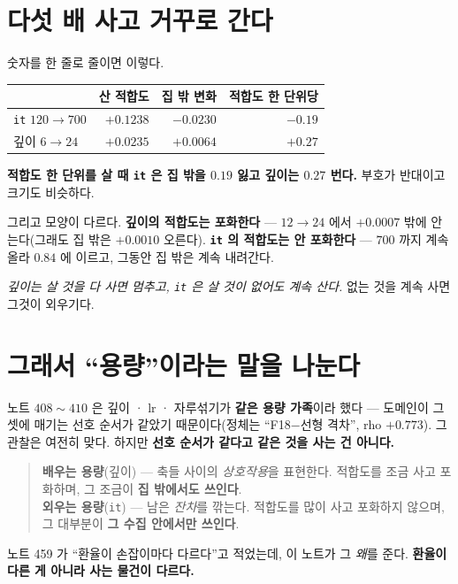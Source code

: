 \documentclass[11pt]{article}
\begin{document}
\section{다섯 배 사고 거꾸로 간다}

숫자를 한 줄로 줄이면 이렇다.

\begin{center}
\begin{tabular}{lrrr}
\hline
 & 산 적합도 & 집 밖 변화 & 적합도 한 단위당 \\
\hline
\texttt{it} $120 \to 700$ & $+0.1238$ & $-0.0230$ & $\mathbf{-0.19}$ \\
깊이 $6 \to 24$ & $+0.0235$ & $+0.0064$ & $\mathbf{+0.27}$ \\
\hline
\end{tabular}
\end{center}

\textbf{적합도 한 단위를 살 때 \texttt{it} 은 집 밖을 $0.19$ 잃고 깊이는
$0.27$ 번다.} 부호가 반대이고 크기도 비슷하다.

그리고 모양이 다르다. \textbf{깊이의 적합도는 포화한다} --- $12 \to 24$
에서 $+0.0007$ 밖에 안 는다(그래도 집 밖은 $+0.0010$ 오른다).
\textbf{\texttt{it} 의 적합도는 안 포화한다} --- $700$ 까지 계속 올라
$0.84$ 에 이르고, 그동안 집 밖은 계속 내려간다.

\emph{깊이는 살 것을 다 사면 멈추고, \texttt{it} 은 살 것이 없어도 계속
산다.} 없는 것을 계속 사면 그것이 외우기다.

\section{그래서 ``용량''이라는 말을 나눈다}

노트 $408 \sim 410$ 은 깊이 · lr · 자루섞기가 \textbf{같은 용량 가족}이라
했다 --- 도메인이 그 셋에 매기는 선호 순서가 같았기 때문이다(정체는
``F18$-$선형 격차'', rho $+0.773$). 그 관찰은 여전히 맞다. 하지만
\textbf{선호 순서가 같다고 같은 것을 사는 건 아니다.}

\begin{quote}
\textbf{배우는 용량}(깊이) --- 축들 사이의 \emph{상호작용}을 표현한다.
적합도를 조금 사고 포화하며, 그 조금이 \textbf{집 밖에서도 쓰인다}. \\
\textbf{외우는 용량}(\texttt{it}) --- 남은 \emph{잔차}를 깎는다. 적합도를
많이 사고 포화하지 않으며, 그 대부분이 \textbf{그 수집 안에서만 쓰인다}.
\end{quote}

노트 459 가 ``환율이 손잡이마다 다르다''고 적었는데, 이 노트가 그
\emph{왜}를 준다. \textbf{환율이 다른 게 아니라 사는 물건이 다르다.}
\end{document}
